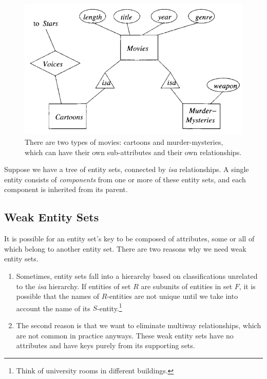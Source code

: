  \begin{figure}[H]
    \centering 
    \includegraphics[scale=0.4]{img/isa.png}
    \caption{There are two types of movies: cartoons and murder-mysteries, which can have their own sub-attributes and their own relationships.} 
    \label{fig:isa}
  \end{figure}

  Suppose we have a tree of entity sets, connected by \textit{isa} relationships. A single entity consists of \textit{components} from one or more of these entity sets, and each component is inherited from its parent. 

\subsection{Weak Entity Sets}

  It is possible for an entity set's key to be composed of attributes, some or all of which belong to another entity set. There are two reasons why we need weak entity sets. 
  \begin{enumerate}
    \item Sometimes, entity sets fall into a hierarchy based on classifications unrelated to the \textit{isa} hierarchy. If entities of set $R$ are subunits of entities in set $F$, it is possible that the names of $R$-entities are not unique until we take into account the name of its $S$-entity.\footnote{Think of university rooms in different buildings.}
    \item The second reason is that we want to eliminate multiway relationships, which are not common in practice anyways. These weak entity sets have no attributes and have keys purely from its supporting sets. 
  \end{enumerate}

